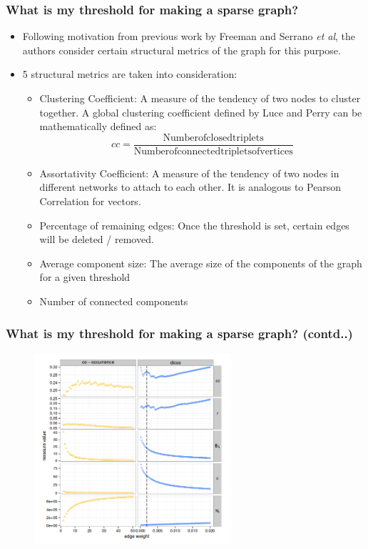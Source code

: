 \documentclass[10pt, compress]{beamer}
\begin{document}
\begin{frame}[fragile]
	\frametitle{What is my threshold for making a sparse graph?}
\vspace{-7mm}
\begin{itemize}
\item Following motivation from previous work by Freeman and Serrano \textit{et al}, the authors consider certain structural metrics of the graph for this purpose.
\item 5 structural metrics are taken into consideration:
\begin{itemize}
	\item Clustering Coefficient: A measure of the tendency of two nodes to cluster together. A global clustering coefficient defined by Luce and Perry can be mathematically defined as:
    \[cc = \frac{\mathrm{Number of closed triplets}}{\mathrm{Number of connected triplets of vertices}}\]
    \item Assortativity Coefficient: A measure of the tendency of two nodes in different networks to attach to each other. It is analogous to Pearson Correlation for vectors.
    \item Percentage of remaining edges: Once the threshold is set, certain edges will be deleted / removed.
    \item Average component size: The average size of the components of the graph for a given threshold
    \item Number of connected components
\end{itemize}
\end{itemize}
\end{frame}

\begin{frame}[fragile]
	\frametitle{What is my threshold for making a sparse graph? {\small (contd..)}}
\vspace{-5mm}
\begin{figure}
	\centering
    \includegraphics[width=0.65\textwidth]{threshold.png}
\end{figure}
\end{frame}
\end{document}
